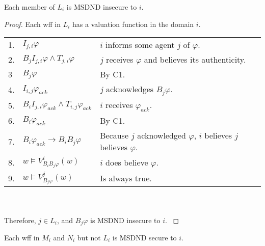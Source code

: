\begin{thm}
Each member of $L_i$ is MSDND insecure to $i$.
\end{thm}

\begin{proof}
Each wff in $L_i$ has a valuation function in the domain $i$.

\begin{table}[H]
\centering
\small
\begin{tabularx}{\linewidth}{l l X}
1. & $I_{j,i} \varphi$ & $i$ informs some agent $j$ of $\varphi$. \\
2. & $B_{j}I_{j,i} \varphi \wedge T_{j,i} \varphi$ & $j$ receives $\varphi$ and believes its authenticity. \\
3  & $B_j \varphi$ & By C1. \\
4. & $I_{i,j} \varphi_{ack}$ & $j$ acknowledges $B_j \varphi$. \\
5. & $B_{i}I_{j,i} \varphi_{ack} \wedge T_{i,j} \varphi_{ack}$ & $i$ receives $\varphi_{ack}$. \\
6. & $B_{i} \varphi_{ack}$ & By C1. \\
7. & $B_{i} \varphi_{ack} \rightarrow B_i B_j \varphi$ & Because $j$ acknowledged $\varphi$, $i$ believes $j$ believes $\varphi$. \\
8. & $w \vDash V_{B_i B_j \varphi}^{i}(w)$ & $i$ does believe $\varphi$. \\
9. & $w \vDash V_{B_j \varphi}^{j}(w)$ & Is always true. %
\end{tabularx} \\~\\
Therefore, $j \in L_i$, and $B_j \varphi$ is MSDND insecure to $i$.
\label{tab:lsetsecurity}
\end{table}
\end{proof}

\begin{thm}
Each wff in $M_i$ and $N_i$ but not $L_i$ is MSDND secure to $i$.
\end{thm}


